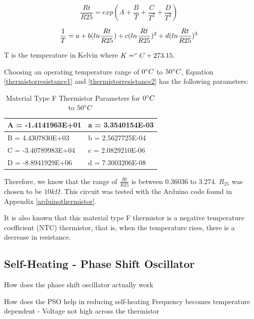 \begin{equation}
	\frac{Rt}{R25} = exp(A+\frac{B}{T}+\frac{C}{T^2}+\frac{D}{T^3}) 
	\label{thermistorresistance1}
\end{equation}

\begin{equation}
	\frac{1}{T} = a+b(ln\frac{Rt}{R25})+c(ln\frac{Rt}{R25})^2+d(ln\frac{Rt}{R25})^3\\
	\label{thermistorresistance2}
\end{equation}

T is the temperature in Kelvin where $K=\degree C+273.15$. 

Choosing an operating temperature range of $0\degree C$ to $50\degree C$, Equation \ref{thermistorresistance1} and \ref{thermistorresistance2} has the following parameters: 

\begin{table}[H]
	\centering
	\caption{Material Type F Thermistor Parameters for $0\degree C$ to $50\degree C$}
	\label{thermistorparameters}
	\begin{tabular}{|l|l|}
		\hline
		A = -1.4141963E+01  & a = 3.3540154E-03 \\ \hline
		B = 4.4307830E+03   & b = 2.5627725E-04 \\ \hline
		C = -3.40789983E+04 & c = 2.0829210E-06 \\ \hline
		D = -8.8941929E+06  & d = 7.3003206E-08 \\ \hline
	\end{tabular}
\end{table}

Therefore, we know that the range of $\frac{Rt}{R25}$ is between 0.36036 to 3.274. $R_{25}$ was chosen to be $10k\Omega$. This circuit was tested with the Arduino code found in Appendix \ref{arduinothermistor}.





It is also known that this material type F thermistor is a negative temperature coefficient (NTC) thermistor, that is, when the temperature rises, there is a decrease in resistance. 

\subsection{Self-Heating - Phase Shift Oscillator}

How does the phase shift oscillator actually work

How does the PSO help in reducing self-heating
Frequency becomes temperature dependent - Voltage not high across the thermistor 

